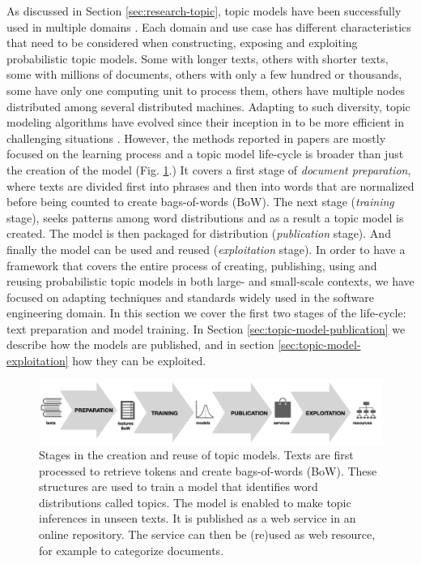 As discussed in Section \ref{sec:research-topic}, topic models have been successfully used in multiple domains  \citep{TapiNzali2017, ONeill2017, Greene2016, He2017}. Each domain and use case has different characteristics that need to be considered when constructing, exposing and exploiting probabilistic topic models. Some with longer texts, others with shorter texts, some with millions of documents, others with only a few hundred or thousands, some have only one computing unit to process them, others have multiple nodes distributed among several distributed machines. Adapting to such diversity, topic modeling algorithms have evolved since their inception in \citep{Deerwester1990} to be more efficient in challenging situations \citep{10.1145/2736277.2741106}. However, the methods reported in papers are mostly focused on the learning process and a topic model life-cycle is broader than just the creation of the model (Fig. \ref{fig:life-cycle}.) It covers a first stage of \textit{document preparation}, where texts are divided first into phrases and then into words that are normalized before being counted to create bags-of-words (BoW). The next stage (\textit{training} stage),  seeks patterns among word distributions and as a result a topic model is created. The model is then packaged for distribution (\textit{publication} stage). And finally the model can be used and reused (\textit{exploitation} stage). In order to have a framework that covers the entire process of creating, publishing, using and reusing probabilistic topic models in both large- and small-scale contexts, we have focused on adapting techniques and standards widely used in the software engineering domain. In this section we cover the first two stages of the life-cycle: text preparation and model training. In Section \ref{sec:topic-model-publication} we describe how the models are published, and in section \ref{sec:topic-model-exploitation} how they can be exploited. 

\begin{figure}
  \center
  \includegraphics[scale=0.21]{life-cycle.png}
  \caption{Stages in the creation and reuse of topic models. Texts are first processed to retrieve tokens and create bags-of-words (BoW). These structures are used to train a model that identifies word distributions called topics. The model is enabled to make topic inferences in unseen texts. It is published as a web service in an online repository. The service can then be (re)used as web resource, for example to categorize documents.}
  \label{fig:life-cycle}
\end{figure}


